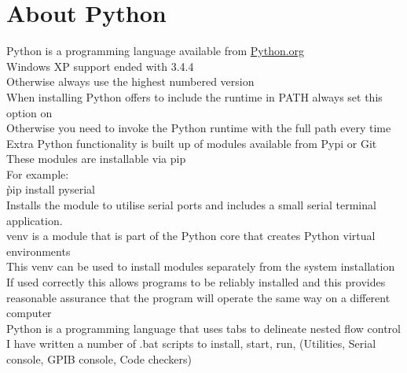\section{About Python}
\label{sec:Python}
\gls{Python} is a programming language available from \href{https://python.org}{Python.org}\\

Windows XP support ended with 3.4.4\\
Otherwise always use the highest numbered version\\

When installing Python offers to include the runtime in PATH always set this option on\\
Otherwise you need to invoke the Python runtime with the full path every time\\

Extra Python functionality is built up of modules available from \gls{Pypi} or \gls{Git}\\
These modules are installable via \gls{pip}\\

For example:\\
\`pip install pyserial\`\\
Installs the module to utilise serial ports and includes a small serial terminal application.\\

\gls{venv} is a module that is part of the Python core that creates Python virtual environments\\
This venv can be used to install modules separately from the system installation\\
If used correctly this allows programs to be reliably installed and this provides reasonable assurance that the program will operate the same way on a different computer\\

Python is a programming language that uses tabs to delineate nested flow control\\

I have written a number of .bat scripts to install, start, run, (Utilities, Serial console, GPIB console, Code checkers)\\
